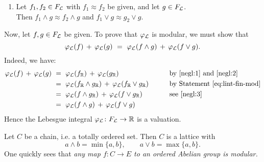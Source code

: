 \documentclass[main.tex]{subfiles}
\begin{document}
\begin{ex}
\begin{enumerate}
\item
\label{negl:3}
Let $f_1,f_2\in F_{\mathcal{L}}$ with $f_1 \approx f_2$ be given,
and let $g\in F_{\mathcal{L}}$.\\
Then $f_1 \wedge g \approx f_2 \wedge g$
and $f_1 \vee g \approx g_2 \vee g$.
\end{enumerate}
Now,
let $f,g\in F_{\mathcal{L}}$ be given.
To prove that $\varphi_{\mathcal{L}}$ is modular,
we must show that 
\begin{equation*}
\Lphi(f)\,+\,\Lphi(g) \ =\  \Lphi(f\wedge g) \,+\, \Lphi(f\vee g).
\end{equation*}
Indeed, we have:
\begin{alignat*}{3}
\varphi_{\mathcal{L}}(f) \,+\, \varphi_{\mathcal{L}}(g) 
  \ &=\  \varphi_{\mathcal{L}}(f_{\mathbb{R}}) \,+\, \varphi_{\mathcal{L}}(g_{\mathbb{R}})
    \qquad&&\text{by \ref{negl:1} and \ref{negl:2}}\\
  \ &=\ \varphi_{\mathcal{L}}(f_{\mathbb{R}}\wedge g_{\mathbb{R}}) \,+\, \varphi_{\mathcal{L}}(f_{\mathbb{R}} \vee g_{\mathbb{R}}) 
    \qquad&&\text{by Statement~\eqref{eq:lint-fin-mod}}\\
  \ &=\ \varphi_{\mathcal{L}}(f\wedge g_{\mathbb{R}}) \,+\, \varphi_{\mathcal{L}}(f \vee g_{\mathbb{R}})
    \qquad&&\text{see \ref{negl:3}}\\
  \ &=\ \varphi_{\mathcal{L}}(f\wedge g) \,+\, \varphi_{\mathcal{L}}(f \vee g)
    \qquad&&
\end{alignat*}
Hence the Lebesgue integral $\varphi_{\mathcal{L}}\colon F_{\mathcal{L}}\rightarrow \mathbb{R}$ is a valuation.
\end{ex}

%
%
\begin{ex}
Let $C$ be a chain,
i.e. a totally ordered set.
Then $C$ is a lattice with
\begin{equation*}
a\wedge b = \min\{a,b\},
 \qquad 
a\vee b = \max\{a,b\}.
\end{equation*}
One quickly sees that
\emph{any map $f\colon C\rightarrow E$
to an ordered Abelian group is modular.}
\end{ex}
\end{document}
